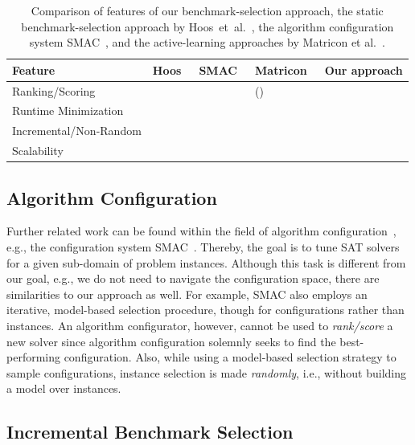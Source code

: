 \documentclass[sn-basic, Numbered]{sn-jnl} %
\newcommand{\cmark}{\ding{51}} %
\newcommand{\xmark}{\ding{55}}
\begin{document}
\begin{table}[tbp]
  \centering
  \caption{Comparison of features of our benchmark-selection approach, the static benchmark-selection approach by Hoos~et~al.~\cite{HoosKSS13}, the algorithm configuration system SMAC~\cite{HutterHL11}, and the active-learning approaches by Matricon et al.~\cite{MatriconAFSH21}.
  }
  \label{tab:requirements}
  \begin{tabular}{
    m{}
    >{\centering\arraybackslash}m{}
    >{\centering\arraybackslash}m{}
    >{\centering\arraybackslash}m{}
    >{\centering\arraybackslash}m{}
  }
    \toprule
    Feature & Hoos~\cite{HoosKSS13} & SMAC~\cite{HutterHL11} & Matricon~\cite{MatriconAFSH21} & Our approach \\
    \midrule
    Ranking/Scoring & \cmark & \xmark & (\cmark) & \cmark \\
    Runtime Minimization & \xmark & \cmark & \cmark & \cmark \\
    Incremental/Non-Random & \xmark & \xmark & \cmark & \cmark \\
    Scalability & \cmark & \cmark & \xmark & \cmark \\
    \bottomrule
  \end{tabular}
\end{table}

\subsection{Algorithm Configuration}

Further related work can be found within the field of algorithm configuration~\cite{HoosHL21,Stutzle0P22}, e.g., the configuration system SMAC~\cite{HutterHL11}.
Thereby, the goal is to tune SAT solvers for a given sub-domain of problem instances.
Although this task is different from our goal, e.g., we do not need to navigate the configuration space, there are similarities to our approach as well.
For example, SMAC also employs an iterative, model-based selection procedure, though for configurations rather than instances.
An algorithm configurator, however, cannot be used to \emph{rank/score} a new solver since algorithm configuration solemnly seeks to find the best-performing configuration.
Also, while using a model-based selection strategy to sample configurations, instance selection is made \emph{randomly}, i.e., without building a model over instances.

\subsection{Incremental Benchmark Selection}
\end{document}
